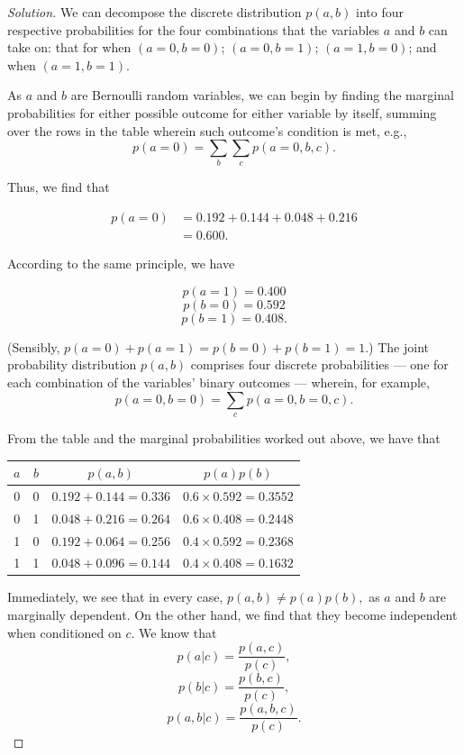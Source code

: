 \documentclass[11pt, oneside]{article}\usepackage[]{graphicx}\usepackage[]{color}
\newenvironment{solution}
  {\begin{proof}[Solution]}
  {\end{proof}}
\begin{document}
\begin{solution}\mbox{} \newline

We can decompose the discrete distribution $p(a, b)$ into four respective probabilities for the four combinations that the variables $a$ and $b$ can take on: that for when $(a=0, b=0)$; $(a=0, b=1)$; $(a=1, b=0)$; and when $(a=1, b=1)$. 

As $a$ and $b$ are Bernoulli random variables, we can begin by finding the marginal probabilities for either possible outcome for either variable by itself, summing over the rows in the table wherein such outcome's condition is met, e.g., $$ p(a=0) = \sum_b \sum_c p(a=0, b, c). $$

Thus, we find that 

  \begin{align}
  p(a=0) &= 0.192 + 0.144 + 0.048 + 0.216 \\
  &= 0.600.
  \end{align}

According to the same principle, we have

$$ p(a=1) = 0.400 $$
$$ p(b=0) = 0.592 $$
$$ p(b=1) = 0.408. $$

(Sensibly, $p(a=0) + p(a=1) = p(b=0) + p(b=1) = 1.$) The joint probability distribution $ p(a, b) $ comprises four discrete probabilities — one for each combination of the variables' binary outcomes — wherein, for example, $$ p(a=0, b=0) = \sum_c p(a=0, b=0, c). $$

From the table and the marginal probabilities worked out above, we have that

  \begin{table}[h!]
  \centering
  \begin{tabular}{ |c|c|c|c| }
  \hline
  $a$ & $b$ & $p(a, b)$ & $p(a)p(b)$ \\ 
  \hline
  0 & 0 & $0.192 + 0.144 = 0.336$ & $0.6 × 0.592 = 0.3552$ \\
  0 & 1 & $0.048 + 0.216 = 0.264$ & $0.6 × 0.408 = 0.2448$ \\
  1 & 0 & $0.192 + 0.064 = 0.256$ & $0.4 × 0.592 = 0.2368$ \\
  1 & 1 & $0.048 + 0.096 = 0.144$ & $0.4 × 0.408 = 0.1632$ \\
  \hline
  \end{tabular}
  \end{table}

Immediately, we see that in every case, $p(a, b) ≠ p(a)p(b),$ as $a$ and $b$ are marginally dependent. On the other hand, we find that they become independent when conditioned on $c$. We know that $$p(a|c) = \frac{p(a, c)}{p(c)},$$ $$p(b|c) = \frac{p(b, c)}{p(c)},$$ $$p(a, b|c) = \frac{p(a, b, c)}{p(c)}.$$ 


\end{solution}
\end{document}

